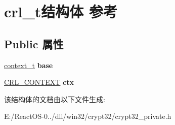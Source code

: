 \hypertarget{structcrl__t}{}\section{crl\+\_\+t结构体 参考}
\label{structcrl__t}
\subsection*{Public 属性}
\begin{DoxyCompactItemize}
\item 
\mbox{\label{structcrl__t_a715cbe477fc19776c037e5e6220d4a38}} 
\hyperlink{struct__context__t}{context\+\_\+t} {\bfseries base}
\item 
\mbox{\label{structcrl__t_a69467115a054cbae38ed3258f33f870f}} 
\hyperlink{struct___c_r_l___c_o_n_t_e_x_t}{C\+R\+L\+\_\+\+C\+O\+N\+T\+E\+XT} {\bfseries ctx}
\end{DoxyCompactItemize}


该结构体的文档由以下文件生成\+:\begin{DoxyCompactItemize}
\item 
E\+:/\+React\+O\+S-\/0../dll/win32/crypt32/crypt32\+\_\+private.\+h\end{DoxyCompactItemize}
